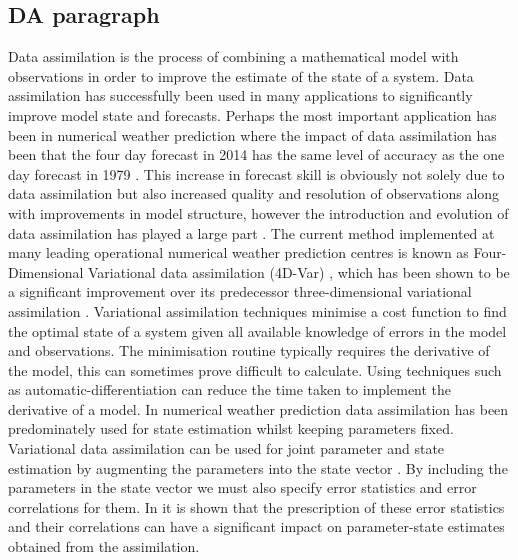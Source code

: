 \documentclass[11pt]{article}
\begin{document}
\subsection{DA paragraph}
Data assimilation is the process of combining a mathematical model with observations in order to improve the estimate of the state of a system. Data assimilation has successfully been used in many applications to significantly improve model state and forecasts. Perhaps the most important application has been in numerical weather prediction where the impact of data assimilation has been that the four day forecast in 2014 has the same level of accuracy as the one day forecast in 1979 \citep{bauer2015quiet}. This increase in forecast skill is obviously not solely due to data assimilation but also increased quality and resolution of observations along with improvements in model structure, however the introduction and evolution of data assimilation has played a large part \citep{dee2011era}. The current method implemented at many leading operational numerical weather prediction centres is known as Four-Dimensional Variational data assimilation (4D-Var) \citep{rabier2000ecmwf, rawlins2007met}, which has been shown to be a significant improvement over its predecessor three-dimensional variational assimilation \citep{lorenc2005does}. Variational assimilation techniques minimise a cost function to find the optimal state of a system given all available knowledge of errors in the model and observations. The minimisation routine typically requires the derivative of the model, this can sometimes prove difficult to calculate. Using techniques such as automatic-differentiation can reduce the time taken to implement the derivative of a model. In numerical weather prediction data assimilation has been predominately used for state estimation whilst keeping parameters fixed. Variational data assimilation can be used for joint parameter and state estimation by augmenting the parameters into the state vector \citep{navon1998practical}. By including the parameters in the state vector we must also specify error statistics and error correlations for them. In \citet{smith2009variational} it is shown that the prescription of these error statistics and their correlations can have a significant impact on parameter-state estimates obtained from the assimilation.
\end{document}
